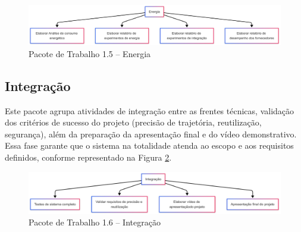 \begin{figure}[H]
	\centering
\includegraphics[width=15cm]{figuras/eap_energia.png}
	\caption{Pacote de Trabalho 1.5 – Energia}
	\label{fig_eap_energia} 
\end{figure}

\newpage

\subsection{Integração}

Este pacote agrupa atividades de integração entre as frentes técnicas, validação dos critérios de sucesso do projeto (precisão de trajetória, reutilização, segurança), além da preparação da apresentação final e do vídeo demonstrativo. Essa fase garante que o sistema na totalidade atenda ao escopo e aos requisitos definidos, conforme representado na Figura \ref{fig_eap_integracao}.

\begin{figure}[H]
	\centering
\includegraphics[width=15cm]{figuras/eap_integracao.png}
	\caption{Pacote de Trabalho 1.6 – Integração}
	\label{fig_eap_integracao}  
\end{figure}

\newpage

\newpage

\newpage

\newpage
